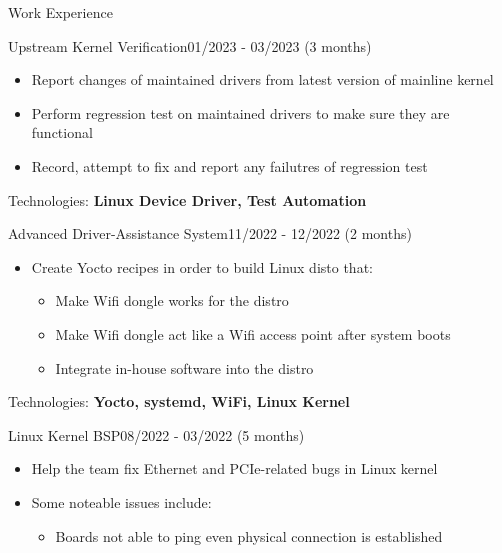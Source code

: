 \documentclass{resume} %
\begin{document}
\begin{rSection}{Work Experience}
\begin{rCompanySubsection}
        \begin{rProjectSubsubsection}{Upstream Kernel Verification}{01/2023 - 03/2023 (3 months)}
            \begin{itemize}
                \setlength{\itemindent}{1.25em}
                \item Report changes of maintained drivers from latest version of mainline kernel
                \item Perform regression test on maintained drivers to make sure they are functional
                \item Record, attempt to fix and report any failutres of regression test
            \end{itemize}
            \hspace*{2.5em}Technologies: \textbf{Linux Device Driver, Test Automation}
        \end{rProjectSubsubsection}
        \begin{rProjectSubsubsection}{Advanced Driver-Assistance System}{11/2022 - 12/2022 (2 months)}
            \begin{itemize}
                \setlength{\itemindent}{1.25em}
                \item Create Yocto recipes in order to build Linux disto that:
                \begin{itemize}
                    \item Make Wifi dongle works for the distro
                    \item Make Wifi dongle act like a Wifi access point after system boots
                    \item Integrate in-house software into the distro
                \end{itemize}
            \end{itemize}
            \hspace*{2.5em}Technologies: \textbf{Yocto, systemd, WiFi, Linux Kernel}
        \end{rProjectSubsubsection}
        \begin{rProjectSubsubsection}{Linux Kernel BSP}{08/2022 - 03/2022 (5 months)}
            \begin{itemize}
                \setlength{\itemindent}{1.25em}
                \item Help the team fix Ethernet and PCIe-related bugs in Linux kernel
                \item Some noteable issues include:
                \begin{itemize}
                    \item Boards not able to ping even physical connection is established

\end{itemize}
\end{itemize}
\end{rProjectSubsubsection}
\end{rCompanySubsection}
\end{rSection}
\end{document}
